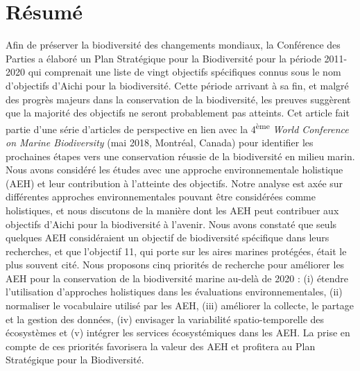 \label{ann1}
\addtocounter{chapter}{1}

\section{Résumé}
Afin de préserver la biodiversité des changements mondiaux, la Conférence des Parties a élaboré un Plan Stratégique pour la Biodiversité pour la période 2011-2020 qui comprenait une liste de vingt objectifs spécifiques connus sous le nom d'objectifs d'Aichi pour la biodiversité. Cette période arrivant à sa fin, et malgré des progrès majeurs dans la conservation de la biodiversité, les preuves suggèrent que la majorité des objectifs ne seront probablement pas atteints. Cet article fait partie d'une série d'articles de perspective en lien avec la 4\textsuperscript{ème} \textit{World Conference on Marine Biodiversity} (mai 2018, Montréal, Canada) pour identifier les prochaines étapes vers une conservation réussie de la biodiversité en milieu marin. Nous avons considéré les études avec une approche environnementale holistique (AEH) et leur contribution à l'atteinte des objectifs. Notre analyse est axée sur différentes approches environnementales pouvant être considérées comme holistiques, et nous discutons de la manière dont les AEH peut contribuer aux objectifs d'Aichi pour la biodiversité à l'avenir. Nous avons constaté que seuls quelques AEH considéraient un objectif de biodiversité spécifique dans leurs recherches, et que l'objectif 11, qui porte sur les aires marines protégées, était le plus souvent cité. Nous proposons cinq priorités de recherche pour améliorer les AEH pour la conservation de la biodiversité marine au-delà de 2020 : (i) étendre l'utilisation d'approches holistiques dans les évaluations environnementales, (ii) normaliser le vocabulaire utilisé par les AEH, (iii) améliorer la collecte, le partage et la gestion des données, (iv) envisager la variabilité spatio-temporelle des écosystèmes et (v) intégrer les services écosystémiques dans les AEH. La prise en compte de ces priorités favorisera la valeur des AEH et profitera au Plan Stratégique pour la Biodiversité.


